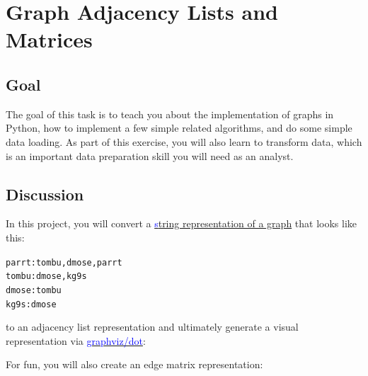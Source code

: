 \chapter{Graph Adjacency Lists and Matrices}

\setcounter{problem}{1}

\section{Goal}

\begin{fullwidth}

The goal of this task is to teach you about the implementation of graphs in Python, how to implement a few simple related algorithms, and do some simple data loading.  As part of this exercise, you will also learn to transform data, which is an important data preparation skill you will need as an analyst. 

\section{Discussion}

In this project, you will convert a \href{https://raw.githubusercontent.com/parrt/msan501/master/data/graph}{{\textcolor{blue}string representation of a graph}} that looks like this:

\begin{alltt}\small
parrt: tombu, dmose, parrt
tombu: dmose, kg9s
dmose: tombu
kg9s: dmose
\end{alltt}

\noindent to an adjacency list representation and ultimately generate a visual representation via \href{http://www.graphviz.org/}{\textcolor{blue}{graphviz/dot}}:

\begin{center}
\end{center}

\noindent For fun, you will also create an edge matrix representation:


\end{fullwidth}
